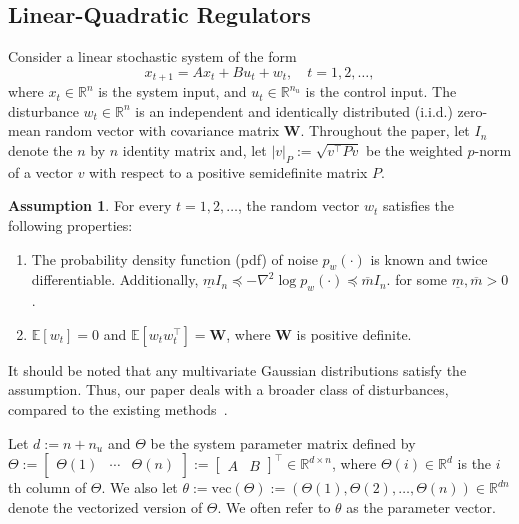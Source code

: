 \documentclass[11pt]{article}
\theoremstyle{plain}
\theoremstyle{definition}
\newtheorem{assumption}[thm]{Assumption}
\theoremstyle{remark}
\begin{document}
\subsection{Linear-Quadratic Regulators}

Consider a linear stochastic system of the form
\begin{equation}\label{sys}
x_{t+1} = Ax_t + B u_t + w_t, \quad t = 1, 2, \ldots,
\end{equation}
where $x_t \in \mathbb{R}^n$ is the system input, and $u_t \in \mathbb{R}^{n_u}$ is the control input. 
The disturbance $w_t \in \mathbb{R}^n$ is an independent and identically distributed (i.i.d.) zero-mean random vector with covariance matrix $\mathbf{W}$.
Throughout the paper, let $I_n$ denote the $n$ by $n$ identity matrix and, {let $|v|_P := \sqrt{v^{\top}Pv}$ be the
 weighted $p$-norm of a vector $v$
with respect to a positive semidefinite matrix $P$.}

\begin{assumption}\label{ass:noise}
For every $t=1, 2, \ldots$, the random vector $w_t$ satisfies the following properties:
\begin{enumerate}
\item The probability density function (pdf) of noise $p_w (\cdot)$ is known and twice differentiable. Additionally, $\underline m I_n \preceq -\nabla^2  \log p_w(\cdot)  \preceq \overline m I_n.$ for some $\underline m, \overline m>0$.


\item $\mathbb{E} [w_t ] = 0$ and $\mathbb{E} [w_t w_t^\top ] = \mathbf{W}$, where $\mathbf{W}$ is positive definite.
 \end{enumerate}
\end{assumption}
It should be noted that any multivariate Gaussian distributions satisfy the assumption. Thus, our paper deals with a broader class of disturbances, compared to the existing methods~\cite{abeille2018improved,ouyang2019posterior,gagrani2022modified}. 

Let $d:= n+n_u$ and ${\Theta}$ be the system parameter matrix defined by
${\Theta} := \begin{bmatrix}  {\Theta}(1) & \cdots & {\Theta} (n)\end{bmatrix} := \begin{bmatrix} 
A & B
\end{bmatrix}^{\top} \in \mathbb{R}^{d \times n}$,
where ${\Theta} (i) \in \mathbb{R}^d$ is the $i$th column of ${\Theta}$. 
We also let 
${\theta} := \mathrm{vec}( \Theta) := ( {\Theta} (1),  {\Theta} (2), \ldots, {\Theta}(n)) \in \mathbb{R}^{dn}$
 denote the vectorized version of ${\Theta}$.
 We often refer to $\theta$ as the parameter vector. 
\end{document}
